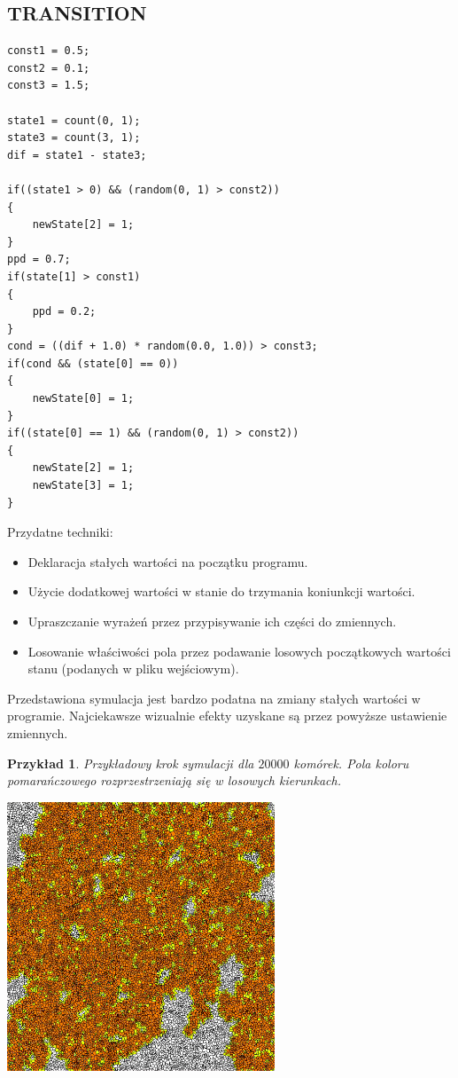\documentclass[declaration,shortabstract, inz]{iithesis}
\theoremstyle{definition} \newtheorem{definition}{Definicja}[]
\theoremstyle{plain} \newtheorem{remark}[definition]{Obserwacja}
\theoremstyle{plain} \newtheorem{theorem}[definition]{Twierdzenie}
\theoremstyle{plain} \newtheorem{example}{Przykład}[definition]
\theoremstyle{plain} \newtheorem{lemma}[definition]{Lemat}
\begin{document}
\subsection{TRANSITION}
\begin{center}
\begin{lstlisting}
const1 = 0.5;
const2 = 0.1;
const3 = 1.5; 
 
state1 = count(0, 1);
state3 = count(3, 1);
dif = state1 - state3;
 
if((state1 > 0) && (random(0, 1) > const2))
{
    newState[2] = 1;
}
ppd = 0.7;
if(state[1] > const1)
{
    ppd = 0.2;
}
cond = ((dif + 1.0) * random(0.0, 1.0)) > const3;
if(cond && (state[0] == 0))
{
    newState[0] = 1;
}
if((state[0] == 1) && (random(0, 1) > const2))
{
    newState[2] = 1;
    newState[3] = 1;
}
\end{lstlisting}
\end{center}

Przydatne techniki:
\begin{itemize}
\item  Deklaracja stałych wartości na początku programu.
\item Użycie dodatkowej wartości w stanie do trzymania koniunkcji wartości.
\item Upraszczanie wyrażeń przez przypisywanie ich części do zmiennych.
\item Losowanie właściwości pola przez podawanie losowych początkowych wartości stanu (podanych w pliku wejściowym).
\end{itemize}

Przedstawiona symulacja jest bardzo podatna na zmiany stałych wartości w programie. Najciekawsze wizualnie efekty uzyskane są przez powyższe ustawienie zmiennych.

\begin{example}
Przykładowy krok symulacji dla $20000$ komórek. Pola koloru pomarańczowego rozprzestrzeniają się w losowych kierunkach.
	\begin{center}
		\includegraphics[width=0.6\textwidth]{sim3}
	\end{center}
\end{example}
\end{document}
